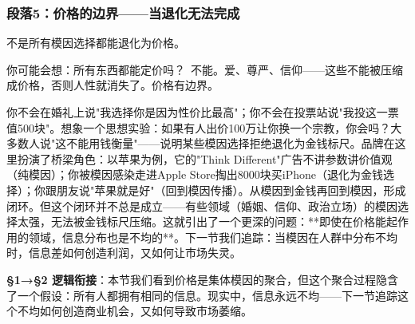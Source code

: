 \documentclass[a4paper,12pt]{book}
\begin{document}
	\subsubsection*{段落5：价格的边界——当退化无法完成}
	不是所有模因选择都能退化为价格。
	\begin{tcolorbox}[colback=yellow!5, title=\textit{读者行为预测}]
		你可能会想：所有东西都能定价吗？\ 不能。爱、尊严、信仰——这些不能被压缩成价格，否则人性就消失了。价格有边界。
	\end{tcolorbox}

你不会在婚礼上说"我选择你是因为性价比最高"；你不会在投票站说"我投这一票值500块"。想象一个思想实验：如果有人出价100万让你换一个宗教，你会吗？大多数人说"这不能用钱衡量"——说明某些模因选择拒绝退化为金钱标尺。品牌在这里扮演了桥梁角色：以苹果为例，它的"Think Different"广告不讲参数讲价值观（纯模因）；你被模因感染走进Apple Store掏出8000块买iPhone（退化为金钱选择）；你跟朋友说"苹果就是好"（回到模因传播）。从模因到金钱再回到模因，形成闭环。但这个闭环并不总是成立——有些领域（婚姻、信仰、政治立场）的模因选择太强，无法被金钱标尺压缩。这就引出了一个更深的问题：**即使在价格能起作用的领域，信息分布也是不均的**。下一节我们追踪：当模因在人群中分布不均时，信息差如何创造利润，又如何让市场失灵。

	\textbf{§1→§2 逻辑衔接}：本节我们看到价格是集体模因的聚合，但这个聚合过程隐含了一个假设：所有人都拥有相同的信息。现实中，信息永远不均——下一节追踪这个不均如何创造商业机会，又如何导致市场萎缩。

	
\end{document}
